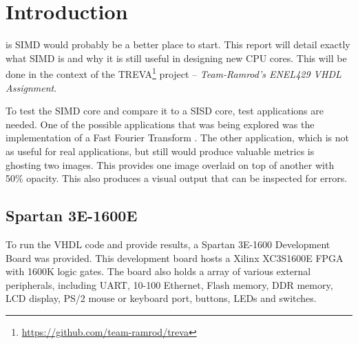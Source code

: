 \section{Introduction}

 is SIMD would probably be a better place to start.  This
report will detail exactly what SIMD is and why it is still useful in designing
new CPU cores.  This will be done in the context of the
TREVA\footnote{\url{https://github.com/team-ramrod/treva}} project --
\emph{Team-Ramrod's ENEL429 VHDL Assignment}.


To test the SIMD core  and compare it to a SISD core, test applications are
needed. One of the possible applications that was being explored was the
implementation of a Fast Fourier Transform \cite{Jamieson198648}. The other
application, which is not as useful for real applications, but still would
produce valuable metrics is ghosting two images. This provides one image
overlaid on top of another with 50\% opacity. This also produces a visual output
that can be inspected for errors.


\subsection{Spartan 3E-1600E}
To run the VHDL code and provide results, a Spartan 3E-1600 Development Board
was provided. This development board hosts a Xilinx XC3S1600E FPGA with 1600K
logic gates. The board also holds a array of various external peripherals,
including UART, 10-100 Ethernet, Flash memory, DDR memory, LCD display, PS/2
mouse or keyboard port, buttons, LEDs and switches.



